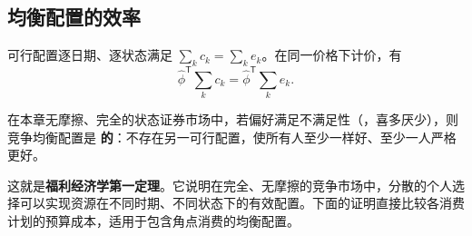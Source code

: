 \subsection{均衡配置的效率}
\label{sec:wj-three-welfare}
可行配置逐日期、逐状态满足 $\sum_k c_k=\sum_k e_k$。在同一价格下计价，有
\begin{equation}
 \hat\phi^{\mathsf T}\sum_k c_k=\hat\phi^{\mathsf T}\sum_k e_k.\label{eq:wj-three-feasibility-value}
\end{equation}
\begin{tcolorbox}[knowledge]
在本章无摩擦、完全的状态证券市场中，若偏好满足不满足性（，喜多厌少），则竞争均衡配置是 \textbf{的}：不存在另一可行配置，使所有人至少一样好、至少一人严格更好。

这就是\textbf{福利经济学第一定理}。它说明在完全、无摩擦的竞争市场中，分散的个人选择可以实现资源在不同时期、不同状态下的有效配置。下面的证明直接比较各消费计划的预算成本，适用于包含角点消费的均衡配置。
\end{tcolorbox}
